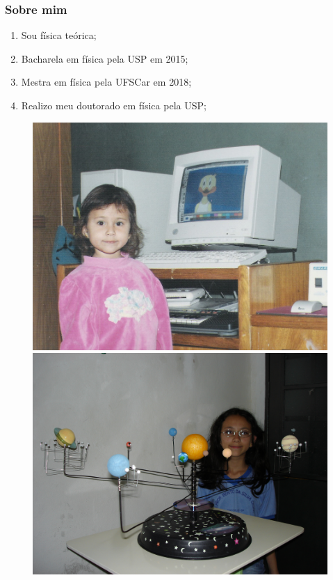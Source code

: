 \documentclass[11pt, brazil]{beamer}
\begin{document}
\begin{frame}
\frametitle{Sobre mim}
\begin{enumerate}
 \justifying
 \item Sou física teórica; 
 \item Bacharela em física pela USP em 2015;
 \item Mestra em física pela UFSCar em 2018;
 \item Realizo meu doutorado em física pela USP;
\end{enumerate}
\pause  
\begin{figure}
 \includegraphics[scale=0.4]{figuras/comp.jpg}
 \includegraphics[scale=0.054]{figuras/solar.jpg}
\end{figure}  
\end{frame}
\end{document}
